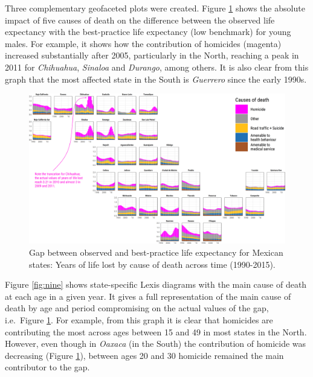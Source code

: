 \documentclass[10pt, twoside, parskip=half]{article}
\begin{document}
Three complementary geofaceted plots were created. Figure \ref{fig:five} shows the absolute impact of five causes of death on the difference between the observed life expectancy with the best-practice life expectancy (low benchmark) for young males. For example, it shows how the contribution of homicides (magenta) increased substantially after 2005, particularly in the North, reaching a peak in 2011 for \emph{Chihuahua}, \emph{Sinaloa} and \emph{Durango}, among others. It is also clear from this graph that the most affected state in the South is \emph{Guerrero} since the early 1990s.



\begin{figure}[!t]
\includegraphics[width=1\linewidth]{fig/gg-five} \caption{Gap between observed and best-practice life expectancy for Mexican states: Years of life lost by cause of death across time (1990-2015).}\label{fig:five}
\end{figure}

Figure \ref{fig:nine} shows state-specific Lexis diagrams with the main cause of death at each age in a given year. It gives a full representation of the main cause of death by age and period compromising on the actual values of the gap, i.e.~Figure \ref{fig:five}. For example, from this graph it is clear that homicides are contributing the most across ages between 15 and 49 in most states in the North. However, even though in \emph{Oaxaca} (in the South) the contribution of homicide was decreasing (Figure \ref{fig:five}), between ages 20 and 30 homicide remained the main contributor to the gap.
\end{document}
